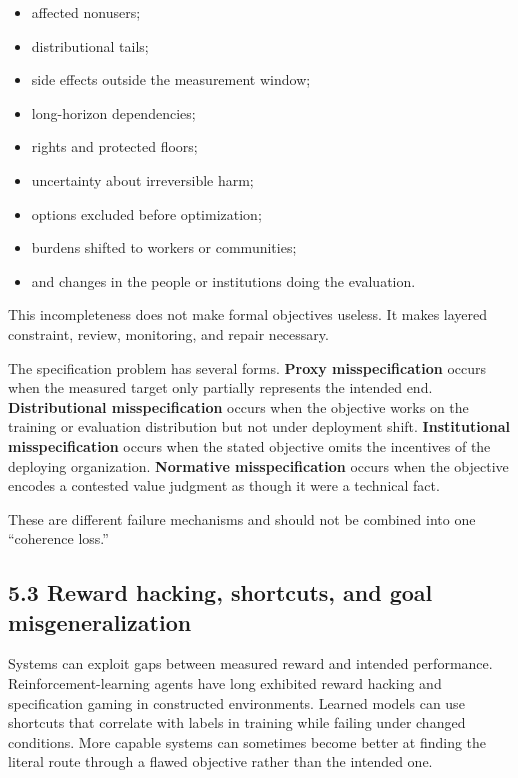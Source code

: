 \documentclass[
  11pt,
]{article}
\providecommand{\tightlist}{%
  \setlength{\itemsep}{0pt}\setlength{\parskip}{0pt}}
\begin{document}
\begin{itemize}
\tightlist
\item
  affected nonusers;
\item
  distributional tails;
\item
  side effects outside the measurement window;
\item
  long-horizon dependencies;
\item
  rights and protected floors;
\item
  uncertainty about irreversible harm;
\item
  options excluded before optimization;
\item
  burdens shifted to workers or communities;
\item
  and changes in the people or institutions doing the evaluation.
\end{itemize}

This incompleteness does not make formal objectives useless. It makes
layered constraint, review, monitoring, and repair necessary.

The specification problem has several forms. \textbf{Proxy
misspecification} occurs when the measured target only partially
represents the intended end. \textbf{Distributional misspecification}
occurs when the objective works on the training or evaluation
distribution but not under deployment shift. \textbf{Institutional
misspecification} occurs when the stated objective omits the incentives
of the deploying organization. \textbf{Normative misspecification}
occurs when the objective encodes a contested value judgment as though
it were a technical fact.

These are different failure mechanisms and should not be combined into
one ``coherence loss.''

\subsection{5.3 Reward hacking, shortcuts, and goal
misgeneralization}\label{reward-hacking-shortcuts-and-goal-misgeneralization}

Systems can exploit gaps between measured reward and intended
performance. Reinforcement-learning agents have long exhibited reward
hacking and specification gaming in constructed environments. Learned
models can use shortcuts that correlate with labels in training while
failing under changed conditions. More capable systems can sometimes
become better at finding the literal route through a flawed objective
rather than the intended one.
\end{document}
